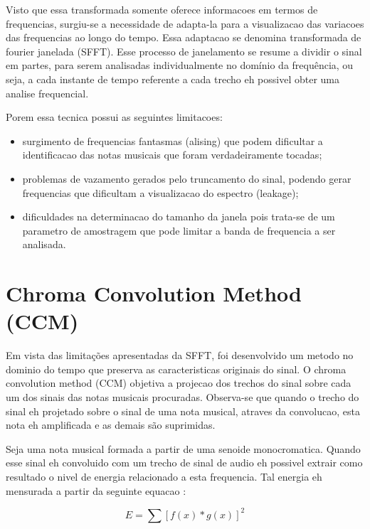 \documentclass{article}
\begin{document}
	Visto que essa transformada somente oferece informacoes em termos de frequencias, surgiu-se a necessidade de adapta-la para a visualizacao das variacoes das frequencias ao longo do tempo. Essa adaptacao se denomina transformada de fourier janelada (SFFT). Esse processo de janelamento se resume a dividir o sinal em partes, para serem analisadas individualmente no domínio da frequência, ou seja, a cada instante de tempo referente a cada trecho eh possivel obter uma analise frequencial.

	Porem essa tecnica possui as seguintes limitacoes:
	\begin{itemize}
		\item surgimento de frequencias fantasmas (alising) que podem dificultar a identificacao das notas musicais que foram verdadeiramente tocadas;
		\item problemas de vazamento gerados pelo truncamento do sinal, podendo gerar frequencias que dificultam a visualizacao do espectro (leakage);
		\item dificuldades na determinacao do tamanho da janela pois trata-se de um parametro de amostragem que pode limitar a banda de frequencia a ser analisada.
	\end{itemize}


\section{Chroma Convolution Method (CCM)}\label{sec:ccm}

	Em vista das limitações apresentadas da SFFT, foi desenvolvido um metodo no dominio do tempo que preserva as caracteristicas originais do sinal. O chroma convolution method (CCM) objetiva a projecao dos trechos do sinal sobre cada um dos sinais das notas musicais procuradas. Observa-se que quando o trecho do sinal eh projetado sobre o sinal de uma nota musical, atraves da convolucao, esta nota eh amplificada e as demais são suprimidas.

	Seja uma nota musical formada a partir de uma senoide monocromatica. Quando esse sinal eh convoluido com um trecho de sinal de audio eh possivel extrair como resultado o nivel de energia relacionado a esta frequencia. Tal energia eh mensurada a partir da seguinte equacao :

	\begin{equation}\label{ccm_equation}
		E = \sum [f(x)*g(x)]^{2}
	\end{equation}
\end{document}
